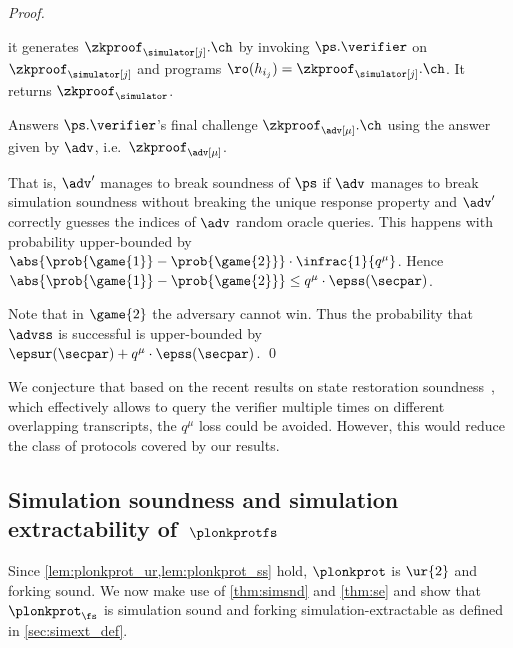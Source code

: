 \begin{proof}
\begin{compactitem}
		it generates $\zkproof_\simulator[j].\ch$ by invoking $\ps.\verifier$ on
		$\zkproof_\simulator[j]$ and programs
		$\ro(h_{i_j}) = \zkproof_\simulator[j].\ch$.  It returns
		$\zkproof_\simulator$.
		\item Answers $\ps.\verifier$'s final challenge $\zkproof_\adv[\mu].\ch$ using the
		answer given by $\adv$, i.e.~$\zkproof_\adv[\mu]$.
	\end{compactitem}
	That is, $\adv'$ manages to break soundness of $\ps$ if $\adv$ manages to
	break simulation soundness without breaking the unique response property and
	$\adv'$ correctly guesses the indices of $\adv$ random oracle queries. This
	happens with probability upper-bounded by $\abs{\prob{\game{1}} -
		\prob{\game{2}}} \cdot \infrac{1}{q^{\mu}}$. Hence $\abs{\prob{\game{1}} -
		\prob{\game{2}}} \leq q^{\mu} \cdot \epss(\secpar)$.
	
	Note that in $\game{2}$ the adversary cannot win. Thus the probability
	that $\advss$ is successful is upper-bounded by
	$\epsur(\secpar) + q^{\mu} \cdot \epss(\secpar)$.  \qed
\end{proof}


We conjecture that based on the recent results on state restoration soundness~\cite{cryptoeprint:2020:1351}, which effectively allows to query the verifier multiple times on different overlapping transcripts, the $q^{\mu}$ loss could be avoided. However, this would reduce the class of protocols covered by our results. 


\subsection{Simulation soundness and simulation
	extractability of~$\plonkprotfs$}
Since \cref{lem:plonkprot_ur,lem:plonkprot_ss} hold, $\plonkprot$ is $\ur{2}$
and forking sound. We now make use of \cref{thm:simsnd} and \cref{thm:se} and show that
$\plonkprot_\fs$ is simulation sound and forking simulation-extractable as defined in
\cref{sec:simext_def}.

